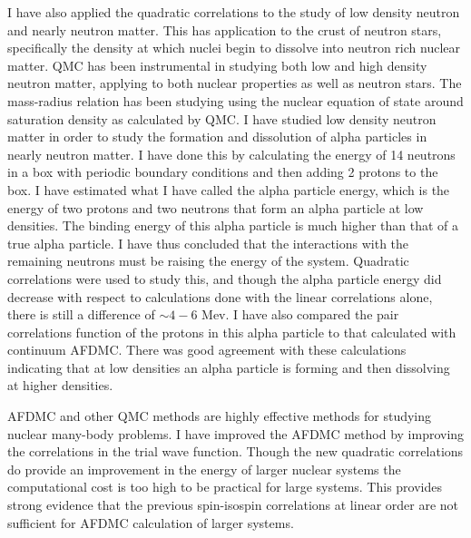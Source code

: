 I have also applied the quadratic correlations to the study of low density neutron and nearly neutron matter. This has application to the crust of neutron stars, specifically the density at which nuclei begin to dissolve into neutron rich nuclear matter. QMC has been instrumental in studying both low and high density neutron matter, applying to both nuclear properties as well as neutron stars. The mass-radius relation has been studying using the nuclear equation of state around saturation density as calculated by QMC. I have studied low density neutron matter in order to study the formation and dissolution of alpha particles in nearly neutron matter. I have done this by calculating the energy of 14 neutrons in a box with periodic boundary conditions and then adding 2 protons to the box. I have estimated what I have called the alpha particle energy, which is the energy of two protons and two neutrons that form an alpha particle at low densities. The binding energy of this alpha particle is much higher than that of a true alpha particle. I have thus concluded that the interactions with the remaining neutrons must be raising the energy of the system. Quadratic correlations were used to study this, and though the alpha particle energy did decrease with respect to calculations done with the linear correlations alone, there is still a difference of $\sim 4-6$ Mev. I have also compared the pair correlations function of the protons in this alpha particle to that calculated with continuum AFDMC. There was good agreement with these calculations indicating that at low densities an alpha particle is forming and then dissolving at higher densities.

AFDMC and other QMC methods are highly effective methods for studying nuclear many-body problems. I have improved the AFDMC method by improving the correlations in the trial wave function. Though the new quadratic correlations do provide an improvement in the energy of larger nuclear systems the computational cost is too high to be practical for large systems. This provides strong evidence that the previous spin-isospin correlations at linear order are not sufficient for AFDMC calculation of larger systems.

